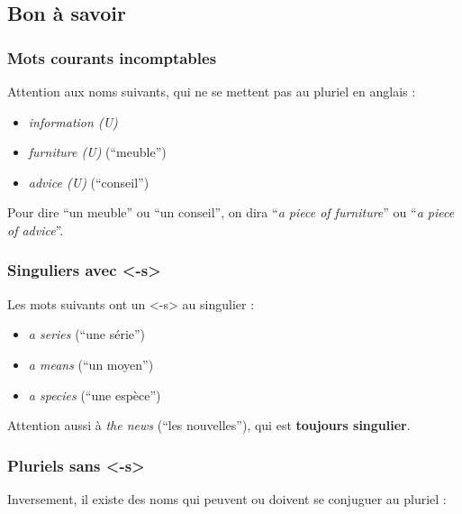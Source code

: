 \documentclass[
  10pt,
]{article}
\providecommand{\tightlist}{%
  \setlength{\itemsep}{0pt}\setlength{\parskip}{0pt}}
\begin{document}
\hypertarget{bon-uxe0-savoir}{%
\subsection{Bon à savoir}\label{bon-uxe0-savoir}}

\hypertarget{mots-courants-incomptables}{%
\subsubsection{Mots courants incomptables}\label{mots-courants-incomptables}}

Attention aux noms suivants, qui ne se mettent pas au pluriel en anglais :

\begin{itemize}
\tightlist
\item
  \emph{information (U)}
\item
  \emph{furniture (U)} (``meuble'')
\item
  \emph{advice (U)} (``conseil'')
\end{itemize}

Pour dire ``un meuble'' ou ``un conseil'', on dira ``\emph{a piece of furniture}'' ou ``\emph{a piece of advice}''.

\hypertarget{singuliers-avec--s}{%
\subsubsection{Singuliers avec \textless-s\textgreater{}}\label{singuliers-avec--s}}

Les mots suivants ont un \textless-s\textgreater{} au singulier :

\begin{itemize}
\tightlist
\item
  \emph{a series} (``une série'')
\item
  \emph{a means} (``un moyen'')
\item
  \emph{a species} (``une espèce'')
\end{itemize}

Attention aussi à \color[HTML]{red}\emph{the news} \color{black} (``les nouvelles''), qui est \textbf{toujours singulier}.

\hypertarget{pluriels-sans--s}{%
\subsubsection{Pluriels sans \textless-s\textgreater{}}\label{pluriels-sans--s}}

Inversement, il existe des noms qui peuvent ou doivent se conjuguer au pluriel :
\end{document}
